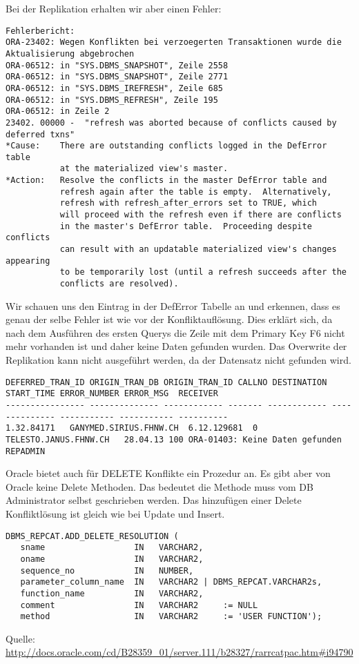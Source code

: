 \documentclass[11pt,a4paper,parskip=half]{scrartcl}
\begin{document}
Bei der Replikation erhalten wir aber einen Fehler:
\begin{lstlisting}
Fehlerbericht:
ORA-23402: Wegen Konflikten bei verzoegerten Transaktionen wurde die Aktualisierung abgebrochen
ORA-06512: in "SYS.DBMS_SNAPSHOT", Zeile 2558
ORA-06512: in "SYS.DBMS_SNAPSHOT", Zeile 2771
ORA-06512: in "SYS.DBMS_IREFRESH", Zeile 685
ORA-06512: in "SYS.DBMS_REFRESH", Zeile 195
ORA-06512: in Zeile 2
23402. 00000 -  "refresh was aborted because of conflicts caused by deferred txns"
*Cause:    There are outstanding conflicts logged in the DefError table
           at the materialized view's master.
*Action:   Resolve the conflicts in the master DefError table and
           refresh again after the table is empty.  Alternatively,
           refresh with refresh_after_errors set to TRUE, which
           will proceed with the refresh even if there are conflicts
           in the master's DefError table.  Proceeding despite conflicts
           can result with an updatable materialized view's changes appearing
           to be temporarily lost (until a refresh succeeds after the
           conflicts are resolved).
\end{lstlisting}

Wir schauen uns den Eintrag in der DefError Tabelle an und erkennen, dass es genau der selbe Fehler ist wie vor der Konfliktauflösung. Dies erklärt sich, da nach dem Ausführen des ersten Querys die Zeile mit dem Primary Key F6 nicht mehr vorhanden ist und daher keine Daten gefunden wurden. Das Overwrite der Replikation kann nicht ausgeführt werden, da der Datensatz nicht gefunden wird.
\begin{lstlisting}
DEFERRED_TRAN_ID ORIGIN_TRAN_DB ORIGIN_TRAN_ID CALLNO DESTINATION START_TIME ERROR_NUMBER ERROR_MSG  RECEIVER
---------------- -------------- ------------ ------- ------------ -------------- ----------- ----------- ----------
1.32.84171   GANYMED.SIRIUS.FHNW.CH  6.12.129681  0 TELESTO.JANUS.FHNW.CH   28.04.13 100 ORA-01403: Keine Daten gefunden  REPADMIN
\end{lstlisting}
Oracle bietet auch für DELETE Konflikte ein Prozedur an. Es gibt aber von Oracle keine Delete Methoden. Das bedeutet die Methode muss vom DB Administrator selbst geschrieben werden. Das hinzufügen einer Delete Konfliktlösung ist gleich wie bei Update und Insert.

\begin{lstlisting}
DBMS_REPCAT.ADD_DELETE_RESOLUTION (
   sname                  IN   VARCHAR2, 
   oname                  IN   VARCHAR2, 
   sequence_no            IN   NUMBER,
   parameter_column_name  IN   VARCHAR2 | DBMS_REPCAT.VARCHAR2s, 
   function_name          IN   VARCHAR2,
   comment                IN   VARCHAR2     := NULL
   method                 IN   VARCHAR2     := 'USER FUNCTION');
\end{lstlisting}
Quelle: \url{http://docs.oracle.com/cd/B28359_01/server.111/b28327/rarrcatpac.htm#i94790}
\end{document}
